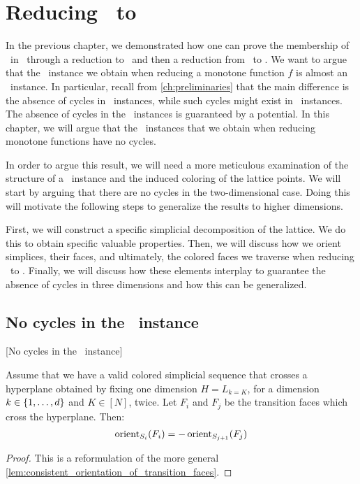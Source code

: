 \setchapterpreamble[u]{\margintoc}
\chapter{Reducing \Tarski\ to \EOPL}\label{ch:eopl_reduction}

In the previous chapter, we demonstrated how one can prove the membership of \Tarski\ in \PPAD\ through a reduction to \Sperner\ and then a reduction from \Sperner\ to \EndOfLine. We want to argue that the \EndOfLine\ instance we obtain when reducing a monotone function $f$ is almost an \EndOfPotentialLine\ instance. In particular, recall from \cref{ch:preliminaries} that the main difference is the absence of cycles in \EndOfPotentialLine\ instances, while such cycles might exist in \EndOfLine\ instances. The absence of cycles in the \EndOfPotentialLine\ instances is guaranteed by a potential. In this chapter, we will argue that the \EndOfLine\ instances that we obtain when reducing monotone functions have no cycles.

In order to argue this result, we will need a more meticulous examination of the structure of a \Tarski\ instance and the induced coloring of the lattice points. We will start by arguing that there are no cycles in the two-dimensional case. Doing this will motivate the following steps to generalize the results to higher dimensions.

First, we will construct a specific simplicial decomposition of the lattice. We do this to obtain specific valuable properties. Then, we will discuss how we orient simplices, their faces, and ultimately, the colored faces we traverse when reducing \Sperner\ to \EndOfLine. Finally, we will discuss how these elements interplay to guarantee the absence of cycles in three dimensions and how this can be generalized.

\section{No cycles in the \EndOfLine\ instance}[No cycles in the \EndOfLine\ instance]

\begin{remark}
	Assume that we have a valid colored simplicial sequence that crosses a hyperplane obtained by fixing one dimension $H = L_{k = K}$, for a dimension $k \in \left\{1, \dots, d\right\}$ and $K \in [N]$, twice. Let $F_i$ and $F_j$ be the transition faces which cross the hyperplane. Then: 
	\begin{align*}
		\operatorname{orient}_{S_i}(F_i) = - \operatorname{orient}_{S_{j+1}}(F_j)
	\end{align*}
\end{remark}
\begin{proof}
	This is a reformulation of the more general \cref{lem:consistent_orientation_of_transition_faces}.
\end{proof}

